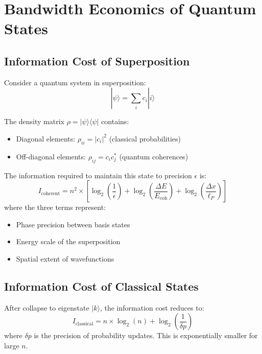 \documentclass[twocolumn,prd,amsmath,amssymb,aps,superscriptaddress,nofootinbib]{revtex4-2}
\begin{document}
\section{Bandwidth Economics of Quantum States}
\label{sec:bandwidth}

\subsection{Information Cost of Superposition}

Consider a quantum system in superposition:
\begin{equation}
|\psi\rangle = \sum_i c_i |i\rangle
\end{equation}

The density matrix $\rho = |\psi\rangle\langle\psi|$ contains:
\begin{itemize}
\item Diagonal elements: $\rho_{ii} = |c_i|^2$ (classical probabilities)
\item Off-diagonal elements: $\rho_{ij} = c_i c_j^*$ (quantum coherences)
\end{itemize}

The information required to maintain this state to precision $\epsilon$ is:
\begin{equation}
I_{\text{coherent}} = n^2 \times \left[\log_2\left(\frac{1}{\epsilon}\right) + \log_2\left(\frac{\Delta E}{E_{\text{coh}}}\right) + \log_2\left(\frac{\Delta x}{\ell_P}\right)\right]
\label{eq:icoherent}
\end{equation}
where the three terms represent:
\begin{itemize}
\item Phase precision between basis states
\item Energy scale of the superposition
\item Spatial extent of wavefunctions
\end{itemize}

\subsection{Information Cost of Classical States}

After collapse to eigenstate $|k\rangle$, the information cost reduces to:
\begin{equation}
I_{\text{classical}} = n \times \log_2(n) + \log_2\left(\frac{1}{\delta p}\right)
\label{eq:iclassical}
\end{equation}
where $\delta p$ is the precision of probability updates. This is exponentially smaller for large $n$.
\end{document}
